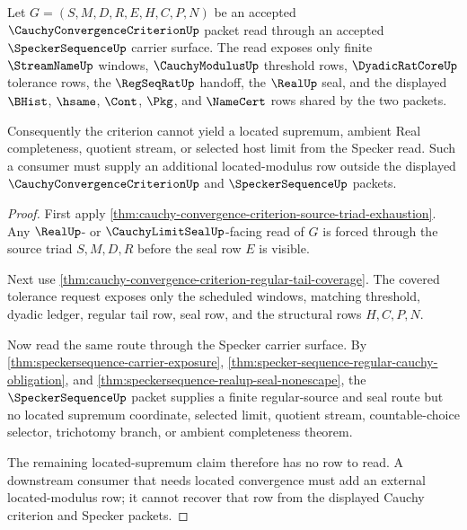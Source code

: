 \begin{theorem}
\label{thm:cauchy-convergence-criterion-specker-boundary}
Let $G=(S,M,D,R,E,H,C,P,N)$ be an accepted $\CauchyConvergenceCriterionUp$ packet read through an accepted $\SpeckerSequenceUp$ carrier surface. The read exposes only finite $\StreamNameUp$ windows, $\CauchyModulusUp$ threshold rows, $\DyadicRatCoreUp$ tolerance rows, the $\RegSeqRatUp$ handoff, the $\RealUp$ seal, and the displayed $\BHist$, $\hsame$, $\Cont$, $\Pkg$, and $\NameCert$ rows shared by the two packets.

Consequently the criterion cannot yield a located supremum, ambient Real completeness, quotient stream, or selected host limit from the Specker read. Such a consumer must supply an additional located-modulus row outside the displayed $\CauchyConvergenceCriterionUp$ and $\SpeckerSequenceUp$ packets.
\end{theorem}
\begin{proof}
First apply \autoref{thm:cauchy-convergence-criterion-source-triad-exhaustion}. Any $\RealUp$- or $\CauchyLimitSealUp$-facing read of $G$ is forced through the source triad $S,M,D,R$ before the seal row $E$ is visible.

Next use \autoref{thm:cauchy-convergence-criterion-regular-tail-coverage}. The covered tolerance request exposes only the scheduled windows, matching threshold, dyadic ledger, regular tail row, seal row, and the structural rows $H,C,P,N$.

Now read the same route through the Specker carrier surface. By \autoref{thm:speckersequence-carrier-exposure}, \autoref{thm:specker-sequence-regular-cauchy-obligation}, and \autoref{thm:speckersequence-realup-seal-nonescape}, the $\SpeckerSequenceUp$ packet supplies a finite regular-source and seal route but no located supremum coordinate, selected limit, quotient stream, countable-choice selector, trichotomy branch, or ambient completeness theorem.

The remaining located-supremum claim therefore has no row to read. A downstream consumer that needs located convergence must add an external located-modulus row; it cannot recover that row from the displayed Cauchy criterion and Specker packets.
\end{proof}

